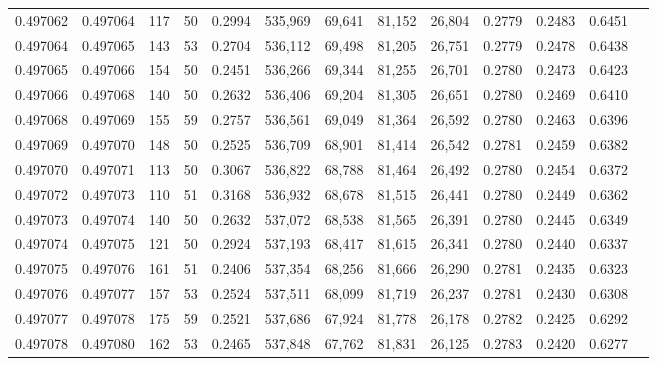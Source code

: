 \begin{tabular}{rrrrrrrrrrrrr}
0.497062 & 0.497064 &   117 &  50 &                                     0.2994 & 535,969 &  69,641 &  81,152 &  26,804 & 0.2779 & 0.2483 & 0.6451 \\
0.497064 & 0.497065 &   143 &  53 &                                     0.2704 & 536,112 &  69,498 &  81,205 &  26,751 & 0.2779 & 0.2478 & 0.6438 \\
0.497065 & 0.497066 &   154 &  50 &                                     0.2451 & 536,266 &  69,344 &  81,255 &  26,701 & 0.2780 & 0.2473 & 0.6423 \\
0.497066 & 0.497068 &   140 &  50 &                                     0.2632 & 536,406 &  69,204 &  81,305 &  26,651 & 0.2780 & 0.2469 & 0.6410 \\
0.497068 & 0.497069 &   155 &  59 &                                     0.2757 & 536,561 &  69,049 &  81,364 &  26,592 & 0.2780 & 0.2463 & 0.6396 \\
0.497069 & 0.497070 &   148 &  50 &                                     0.2525 & 536,709 &  68,901 &  81,414 &  26,542 & 0.2781 & 0.2459 & 0.6382 \\
0.497070 & 0.497071 &   113 &  50 &                                     0.3067 & 536,822 &  68,788 &  81,464 &  26,492 & 0.2780 & 0.2454 & 0.6372 \\
0.497072 & 0.497073 &   110 &  51 &                                     0.3168 & 536,932 &  68,678 &  81,515 &  26,441 & 0.2780 & 0.2449 & 0.6362 \\
0.497073 & 0.497074 &   140 &  50 &                                     0.2632 & 537,072 &  68,538 &  81,565 &  26,391 & 0.2780 & 0.2445 & 0.6349 \\
0.497074 & 0.497075 &   121 &  50 &                                     0.2924 & 537,193 &  68,417 &  81,615 &  26,341 & 0.2780 & 0.2440 & 0.6337 \\
0.497075 & 0.497076 &   161 &  51 &                                     0.2406 & 537,354 &  68,256 &  81,666 &  26,290 & 0.2781 & 0.2435 & 0.6323 \\
0.497076 & 0.497077 &   157 &  53 &                                     0.2524 & 537,511 &  68,099 &  81,719 &  26,237 & 0.2781 & 0.2430 & 0.6308 \\
0.497077 & 0.497078 &   175 &  59 &                                     0.2521 & 537,686 &  67,924 &  81,778 &  26,178 & 0.2782 & 0.2425 & 0.6292 \\
0.497078 & 0.497080 &   162 &  53 &                                     0.2465 & 537,848 &  67,762 &  81,831 &  26,125 & 0.2783 & 0.2420 & 0.6277 \\

\end{tabular}

